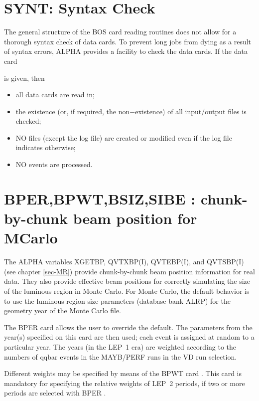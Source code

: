 \section{\label{sec-DCSYNT}SYNT: Syntax Check}
\par
\par The general structure of the BOS card reading routines does not
allow
for a thorough syntax check of data cards.
To prevent long jobs from dying as a result of syntax errors, ALPHA
provides a
facility to check the data cards.
If the data card
\begin{indentlist}{ 2.50cm}{ 2.75cm}
is given, then
 
\begin{itemize}
\item all data cards are read in;
\item the existence (or, if required, the non$-$existence) of all
input/output files is checked;
\item NO files (except the log file) are created or modified even
if the
log file indicates otherwise;
\item NO events are processed.
\end{itemize}
\end{indentlist}

\section{\label{sec-DCHUNK}BPER,BPWT,BSIZ,SIBE : chunk-by-chunk beam position for MCarlo}
\par
 
The ALPHA variables XGETBP, QVTXBP(I), QVTEBP(I), and QVTSBP(I) (see chapter \ref{sec-MR})
provide chunk-by-chunk beam position information for real data.  They also
provide effective beam positions for correctly simulating the size of the
luminous region in Monte Carlo.  For Monte Carlo, the default behavior is
to use the luminous region size parameters (database bank ALRP) for the
geometry year of the Monte Carlo file.
 
The BPER card allows the user to
override the default.  The parameters from the year(s) specified on this
card are then used; each event is assigned at random to a particular year.
The years (in the LEP~1 era) are weighted according to the numbers of qqbar
events in the MAYB/PERF runs in the VD run selection.
 
Different weights may be specified by means of the BPWT card .  This card is mandatory for
specifying the relative weights of LEP~2 periods, if two or more periods
are selected with BPER .
 
